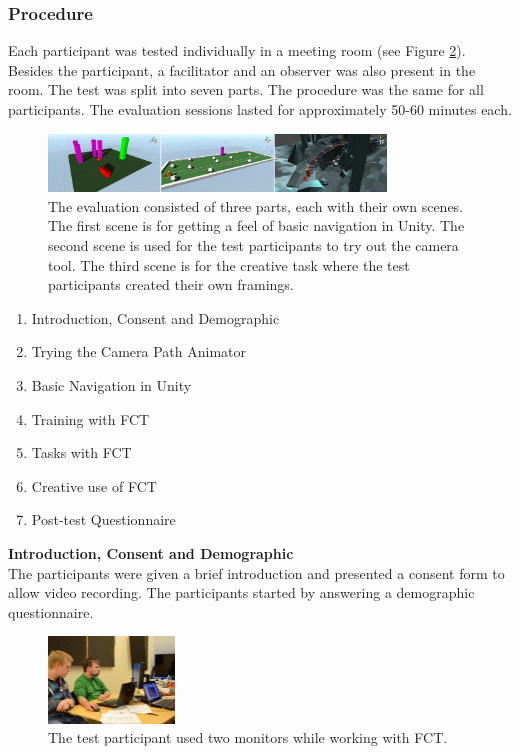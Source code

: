 \subsubsection{Procedure}
Each participant was tested individually in a meeting room (see Figure \ref{fig:tt}). Besides the participant, a facilitator and an observer was also present in the room. The test was split into seven parts. The procedure was the same for all participants. The evaluation sessions lasted for approximately 50-60 minutes each.

\begin{figure}[hbtp]
\centering
\includegraphics[width=0.8\textwidth]{Pics/sceneAll_horizontal}
\caption{The evaluation consisted of three parts, each with their own scenes. The first scene is for getting a feel of basic navigation in Unity. The second scene is used for the test participants to try out the camera tool. The third scene is for the creative task where the test participants created their own framings.}
\label{fig:sceneAll}
\end{figure}

\begin{enumerate}
\item Introduction, Consent and Demographic
\item Trying the Camera Path Animator
\item Basic Navigation in Unity
\item Training with FCT
\item Tasks with FCT
\item Creative use of FCT
\item Post-test Questionnaire
\end{enumerate}

\textbf{Introduction, Consent and Demographic}\\
The participants were given a brief introduction and presented a consent form to allow video recording. The participants started by answering a demographic questionnaire. 

\begin{figure}[htbp]
\centering
\includegraphics[width=0.3\textwidth]{Pics/test_setup}
\caption{The test participant used two monitors while working with FCT.}
\label{fig:tt}
\end{figure}

